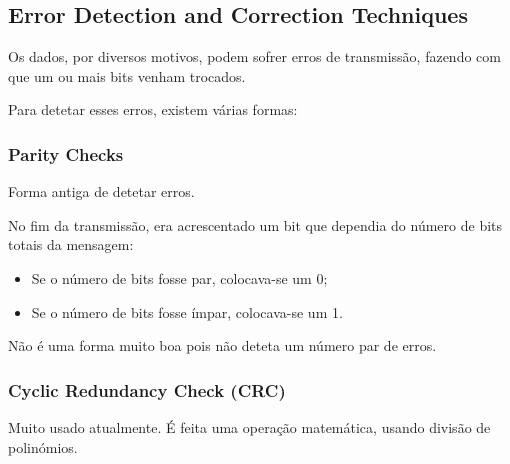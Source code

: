 \documentclass[12pt]{article}
\begin{document}
\subsection{Error Detection and Correction Techniques}

Os dados, por diversos motivos, podem sofrer erros de transmissão, fazendo com que um ou mais bits venham trocados.

Para detetar esses erros, existem várias formas:

\subsubsection{Parity Checks}

Forma antiga de detetar erros.

No fim da transmissão, era acrescentado um bit que dependia do número de bits totais da mensagem:

\begin{itemize}
    \item Se o número de bits fosse par, colocava-se um 0;
    \item Se o número de bits fosse ímpar, colocava-se um 1.
\end{itemize}

Não é uma forma muito boa pois não deteta um número par de erros.

\subsubsection{Cyclic Redundancy Check (CRC)}

Muito usado atualmente. É feita uma operação matemática, usando divisão de polinómios.
\end{document}

